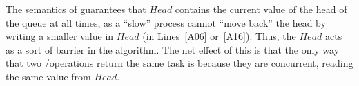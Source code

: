 The semantics of \MaxW guarantees that $Head$ contains the current value of the head of the queue at all times, as a ``slow'' process cannot ``move back'' the head by writing a smaller value in \(Head\) (in Lines~\ref{A06} or~\ref{A16}).  Thus, the \MaxReg \(Head\) acts as a sort of barrier in the algorithm.  The net effect of this is that the only way that two \Take/\Steal operations return the same task is because they are concurrent, reading the same value from \(Head\).

\begin{figure}[ht]
  \centering

\end{figure}
